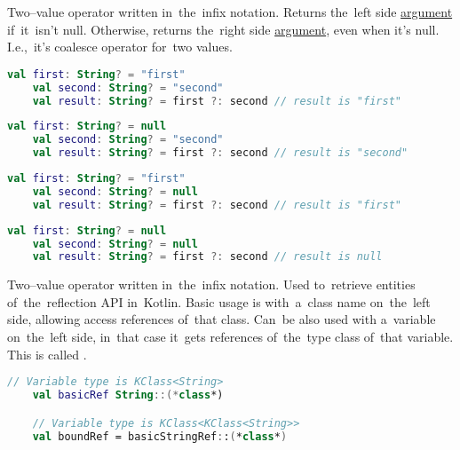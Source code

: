 Two--value operator written in~the~infix notation.
Returns the~left side \hyperref[parameterargument]{argument} if~it~isn't null.
Otherwise, returns the~right side \hyperref[parameterargument]{argument}, even when it's null.
I.e.,~it's coalesce operator for~two values.

\begin{lstlisting}[language=Kotlin]
    val first: String? = "first"
    val second: String? = "second"
    val result: String? = first ?: second // result is "first"
\end{lstlisting}

\begin{lstlisting}[language=Kotlin]
    val first: String? = null
    val second: String? = "second"
    val result: String? = first ?: second // result is "second"
\end{lstlisting}

\begin{lstlisting}[language=Kotlin]
    val first: String? = "first"
    val second: String? = null
    val result: String? = first ?: second // result is "first"
\end{lstlisting}

\begin{lstlisting}[language=Kotlin]
    val first: String? = null
    val second: String? = null
    val result: String? = first ?: second // result is null
\end{lstlisting}
\newpage

\label{kotlinreflection}
Two--value operator written in~the~infix notation.
Used to~retrieve entities of~the~reflection API in~Kotlin.
Basic usage is with~a~class name on~the~left side, allowing access references of~that class.
Can~be also used with a~variable on~the~left side, in~that case it~gets references of~the~type class of~that variable.
This is called .

\begin{lstlisting}[language=Kotlin]
    // Variable type is KClass<String>
    val basicRef String::(*class*)

    // Variable type is KClass<KClass<String>>
    val boundRef = basicStringRef::(*class*)
\end{lstlisting}
\newline

